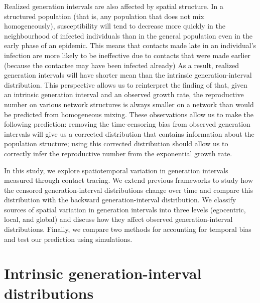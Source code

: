 \documentclass[12pt]{article}
\begin{document}
Realized generation intervals are also affected by spatial structure.
In a structured population (that is, any population that does not mix homogeneously), susceptibility will tend to decrease more quickly in the neighbourhood of infected individuals than in the general population even in the early phase of an epidemic. 
This means that contacts made late in an individual's infection are more likely to be ineffective due to contacts that were made earlier (because the contactee may have been infected already) 
As a result, realized generation intervals will have shorter mean than the intrinsic generation-interval distribution.
This perspective allows us to reinterpret the finding of \cite{trapman2016inferring} that, given an intrinsic generation interval and an observed growth rate, the reproductive number on various network structures is always smaller on a network than would be predicted from homogeneous mixing.
These observations allow us to make the following prediction: removing the time-censoring bias from observed generation intervals will give us a corrected distribution that contains information about the population structure; using this corrected distribution should allow us to correctly infer the reproductive number from the exponential growth rate.

In this study, we explore spatiotemporal variation in generation intervals measured through contact tracing.
We extend previous frameworks to study how the censored generation-interval distributions change over time and compare this distribution with the backward generation-interval distribution.
We classify sources of spatial variation in generation intervals into three levels (egocentric, local, and global) and discuss how they affect observed generation-interval distributions.
Finally, we compare two methods for accounting for temporal bias and test our prediction using simulations.

\section{Intrinsic generation-interval distributions}
\end{document}
